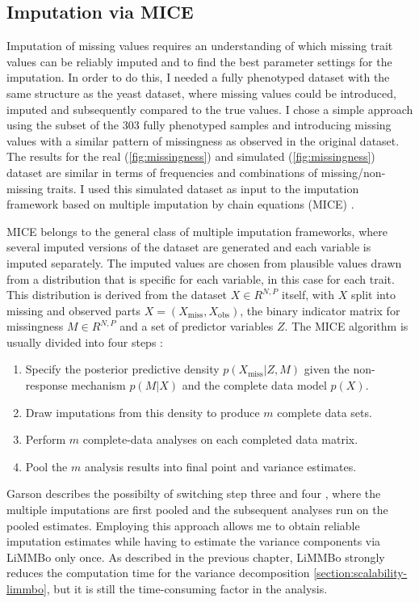 \subsection{Imputation via MICE} 
Imputation of missing values requires an understanding of which missing trait values can be reliably imputed and to find the best parameter settings for the imputation. In order to do this, I needed a fully phenotyped dataset with the same structure as the yeast dataset, where missing values could be introduced, imputed and subsequently compared to the true values. I chose a simple approach using the subset of the \num{303} fully phenotyped samples and introducing missing values with a similar pattern of missingness as observed in the original dataset. The results for the real (\cref{fig:missingness}) and simulated (\cref{fig:missingness}) dataset are similar in terms of frequencies and combinations of missing/non-missing traits. I used this simulated dataset as input to the imputation framework based on multiple imputation by chain equations (MICE) \citep{vanBuuren2011}. 

MICE belongs to the general class of multiple imputation frameworks, where several imputed versions of the dataset are generated and each variable is imputed separately. The imputed values are chosen from plausible values drawn from a distribution that is specific for each variable, in this case for each trait. This distribution is derived from the dataset \(X \in R^{N,P}\) itself,  with \(X\) split into missing and observed parts \(X = (X_\text{miss}, X_\text{obs})\), the binary indicator matrix for missingness \(M \in R^{N,P}\) and a set of predictor variables \(Z\). The MICE algorithm is usually divided into four steps \citep{Rubin1978,vanBuuren1999,Pigott2001}:
\begin{enumerate}
\item Specify the posterior predictive density \(p(X_\text{miss} | Z, M)\) given the non-response mechanism  \(p(M | X)\)  and the complete data model  \(p(X)\).
\item Draw imputations from this density to produce \(m\) complete data sets. 
\item Perform \(m\) complete-data analyses on each completed data matrix. 
\item Pool the \(m\) analysis results into final point and variance estimates.
\end{enumerate}
Garson describes the possibilty of switching step three and four \citeyear{Garson2015}, where the multiple imputations are first pooled and the subsequent analyses run on the pooled estimates. Employing this approach allows me to  obtain reliable imputation estimates while having to estimate the variance components via LiMMBo only once. As described in the previous chapter, LiMMBo strongly reduces the computation time for the variance decomposition \cref{section:scalability-limmbo}, but it is still the time-consuming factor in the analysis. 


